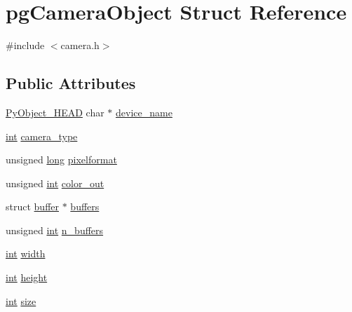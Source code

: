\hypertarget{structpg_camera_object}{}\section{pg\+Camera\+Object Struct Reference}
\label{structpg_camera_object}


{\ttfamily \#include $<$camera.\+h$>$}

\subsection*{Public Attributes}
\begin{DoxyCompactItemize}
\item 
\mbox{\hyperlink{_python27_2object_8h_a0bf35c1f3ea13f925de94d8593db3b7e}{Py\+Object\+\_\+\+H\+E\+AD}} char $\ast$ \mbox{\hyperlink{structpg_camera_object_a764be1196a56703f31cfa7291a8cccbb}{device\+\_\+name}}
\item 
\mbox{\hyperlink{warnings_8h_a74f207b5aa4ba51c3a2ad59b219a423b}{int}} \mbox{\hyperlink{structpg_camera_object_afd92ace99e80b897f7efd64340a40dd1}{camera\+\_\+type}}
\item 
unsigned \mbox{\hyperlink{modsupport_8h_a0cb68e00fb9fb1260ee2daadd9fe6611}{long}} \mbox{\hyperlink{structpg_camera_object_aadebf2a23776c2df3c8031eed99fcfe4}{pixelformat}}
\item 
unsigned \mbox{\hyperlink{warnings_8h_a74f207b5aa4ba51c3a2ad59b219a423b}{int}} \mbox{\hyperlink{structpg_camera_object_a2775612fd5cbf0b354b38965fc54633e}{color\+\_\+out}}
\item 
struct \mbox{\hyperlink{classbuffer}{buffer}} $\ast$ \mbox{\hyperlink{structpg_camera_object_a2ca9a8669a392fd341ecaec028fcf428}{buffers}}
\item 
unsigned \mbox{\hyperlink{warnings_8h_a74f207b5aa4ba51c3a2ad59b219a423b}{int}} \mbox{\hyperlink{structpg_camera_object_a36c2aa8e4eab51a8d5c4fb7637fcb529}{n\+\_\+buffers}}
\item 
\mbox{\hyperlink{warnings_8h_a74f207b5aa4ba51c3a2ad59b219a423b}{int}} \mbox{\hyperlink{structpg_camera_object_ad791238437a5d71c140bd39d6af87271}{width}}
\item 
\mbox{\hyperlink{warnings_8h_a74f207b5aa4ba51c3a2ad59b219a423b}{int}} \mbox{\hyperlink{structpg_camera_object_a9771d6c042288e7d1952e44c5532171f}{height}}
\item 
\mbox{\hyperlink{warnings_8h_a74f207b5aa4ba51c3a2ad59b219a423b}{int}} \mbox{\hyperlink{structpg_camera_object_ad5646e2f4c997c12a44a52ad59c2c608}{size}}

\end{DoxyCompactItemize}

